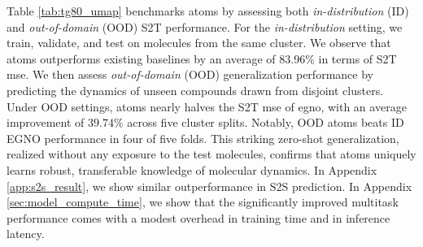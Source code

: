 Table \ref{tab:tg80_umap} benchmarks \gls{atoms} by assessing both \textit{in-distribution} (ID) and \textit{out-of-domain} (OOD) S2T performance. For the \textit{in-distribution} setting, we train, validate, and test on molecules from the same cluster. We observe that \gls{atoms} outperforms existing baselines by an average of 83.96\% in terms of S2T \gls{mse}. We then assess \textit{out-of-domain} (OOD) generalization performance by predicting the dynamics of unseen compounds drawn from disjoint clusters. Under OOD settings, \gls{atoms} nearly halves the S2T \gls{mse} of \gls{egno}, with an average improvement of $39.74\%$ across five cluster splits. Notably, OOD \gls{atoms} beats ID EGNO performance in four of five folds. This striking zero-shot generalization, realized without any exposure to the test molecules, confirms that \gls{atoms} uniquely learns robust, transferable knowledge of molecular dynamics. In Appendix \ref{app:s2s_result}, we show similar outperformance in S2S prediction. In Appendix \ref{sec:model_compute_time}, we show that the significantly improved multitask performance comes with a modest overhead in training time and in inference latency.


